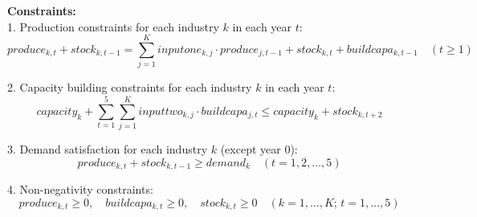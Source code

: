 \documentclass{article}
\begin{document}
\textbf{Constraints:} \\
1. Production constraints for each industry $k$ in each year $t$:
\[
produce_{k, t} + stock_{k, t-1} = \sum_{j=1}^{K} inputone_{k, j} \cdot produce_{j, t-1} + stock_{k, t} + buildcapa_{k, t-1} \quad (t \geq 1)
\]

2. Capacity building constraints for each industry $k$ in each year $t$:
\[
capacity_{k} + \sum_{t=1}^{5} \sum_{j=1}^{K} inputtwo_{k, j} \cdot buildcapa_{j, t} \leq capacity_{k} + stock_{k, t + 2}
\]

3. Demand satisfaction for each industry $k$ (except year 0):
\[
produce_{k, t} + stock_{k, t-1} \geq demand_k \quad (t = 1, 2, \ldots, 5)
\]

4. Non-negativity constraints:
\[
produce_{k, t} \geq 0, \quad buildcapa_{k, t} \geq 0, \quad stock_{k, t} \geq 0 \quad (k = 1, \ldots, K; \, t = 1, \ldots, 5)
\]
\end{document}
